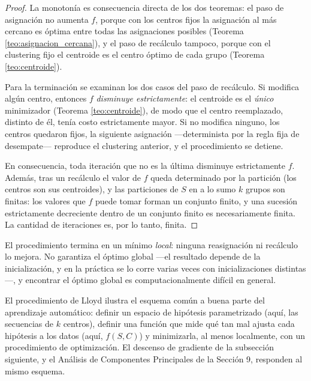 \documentclass[11pt, a4paper]{article}
\begin{document}
\begin{proof}
La monotonía es consecuencia directa de los dos teoremas: el paso de asignación no aumenta $f$, porque con los centros fijos la asignación al más cercano es óptima entre todas las asignaciones posibles (Teorema \ref{teo:asignacion_cercana}), y el paso de recálculo tampoco, porque con el clustering fijo el centroide es el centro óptimo de cada grupo (Teorema \ref{teo:centroide}).

Para la terminación se examinan los dos casos del paso de recálculo. Si modifica algún centro, entonces $f$ \emph{disminuye estrictamente}: el centroide es el \emph{único} minimizador (Teorema \ref{teo:centroide}), de modo que el centro reemplazado, distinto de él, tenía costo estrictamente mayor. Si no modifica ninguno, los centros quedaron fijos, la siguiente asignación —determinista por la regla fija de desempate— reproduce el clustering anterior, y el procedimiento se detiene.

En consecuencia, toda iteración que no es la última disminuye estrictamente $f$. Además, tras un recálculo el valor de $f$ queda determinado por la partición (los centros son sus centroides), y las particiones de $S$ en a lo sumo $k$ grupos son finitas: los valores que $f$ puede tomar forman un conjunto finito, y una sucesión estrictamente decreciente dentro de un conjunto finito es necesariamente finita. La cantidad de iteraciones es, por lo tanto, finita.
\end{proof}

\obs El procedimiento termina en un mínimo \emph{local}: ninguna reasignación ni recálculo lo mejora. No garantiza el óptimo global —el resultado depende de la inicialización, y en la práctica se lo corre varias veces con inicializaciones distintas—, y encontrar el óptimo global es computacionalmente difícil en general.

\obs El procedimiento de Lloyd ilustra el esquema común a buena parte del aprendizaje automático: definir un espacio de hipótesis parametrizado (aquí, las secuencias de $k$ centros), definir una función que mide qué tan mal ajusta cada hipótesis a los datos (aquí, $f(S, C)$) y minimizarla, al menos localmente, con un procedimiento de optimización. El descenso de gradiente de la subsección siguiente, y el Análisis de Componentes Principales de la Sección 9, responden al mismo esquema.
\end{document}
